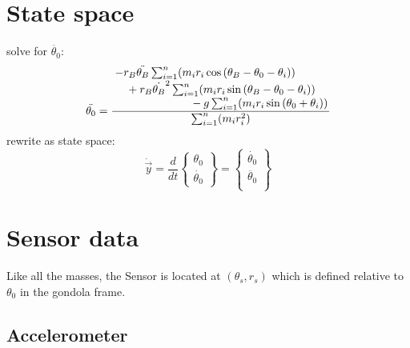 \documentclass[titlepage]{article}
\numberwithin{equation}{section}
\begin{document}
\pagebreak
\section{State space}
solve for $\ddot{\theta_0}$:
\begin{equation}
\ddot{\theta_0} =
    \frac{
        \splitfrac{
            \splitfrac{
                - r_B \ddot{\theta_B} \sum_{i=1}^{n}(m_i r_i \cos{(\theta_B - \theta_0 - \theta_i)})
            } {
                + r_B \dot{\theta_B}^2 \sum_{i=1}^{n}(m_i r_i \sin{(\theta_B - \theta_0 - \theta_i)})
            }
        } {
            - g \sum_{i=1}^{n}(m_i r_i \sin{(\theta_0 + \theta_i)})
        }
    } {
        \sum_{i=1}^{n}(m_i r_i^2)
    }
\end{equation}
rewrite as state space:
\begin{equation}
\dot{\overrightarrow{y}} = \frac{d}{dt}
\left\{\!
\begin{array}{c}
  \theta_0 \\
  \dot{\theta_0}
\end{array}
\!\right\} = 
\left\{\!
\begin{array}{c}
  \dot{\theta_0} \\
  \ddot{\theta_0} \\
\end{array}
\!\right\}
\end{equation}

\section{Sensor data}
Like all the masses, the Sensor is located at $(\theta_s, r_s)$ which is defined relative to $\theta_0$ in the gondola frame.

\subsection{Accelerometer}
\end{document}
